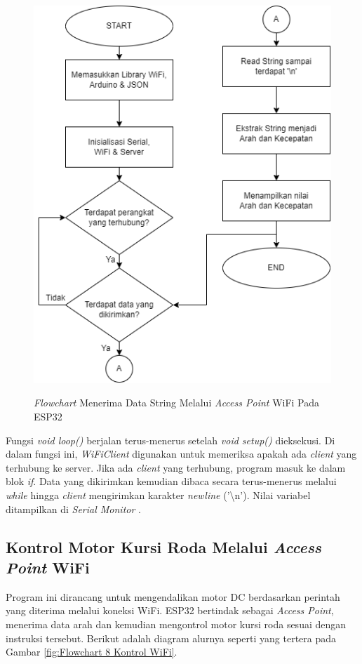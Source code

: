 \begin{figure}[H]
\centering
\includegraphics[scale=0.5]{gambar/bab3/4. String WiFi.png}
\caption{\emph{Flowchart} Menerima Data String Melalui \emph{Access Point} WiFi Pada ESP32}
\label{fig:Flowchart 4 String}
\parencite{ekatama2024perancangan}
\end{figure}

Fungsi \emph{void loop()} berjalan terus-menerus setelah \emph{void setup()} dieksekusi. Di dalam fungsi ini, \emph{WiFiClient} digunakan untuk memeriksa apakah ada \emph{client} yang terhubung ke server. Jika ada \emph{client} yang terhubung, program masuk ke dalam blok \emph{if}. Data yang dikirimkan kemudian dibaca secara terus-menerus melalui \emph{while} hingga \emph{client} mengirimkan karakter \emph{newline} ('\textbackslash n'). Nilai variabel ditampilkan di \emph{Serial Monitor} \parencite{ekatama2024perancangan}.

\subsection{Kontrol Motor Kursi Roda Melalui \emph{Access Point} WiFi}

Program ini dirancang untuk mengendalikan motor DC berdasarkan perintah yang diterima melalui koneksi WiFi. ESP32 bertindak sebagai \emph{Access Point}, menerima data arah dan kemudian mengontrol motor kursi roda sesuai dengan instruksi tersebut. Berikut adalah diagram alurnya seperti yang tertera pada Gambar \ref{fig:Flowchart 8 Kontrol WiFi}.

